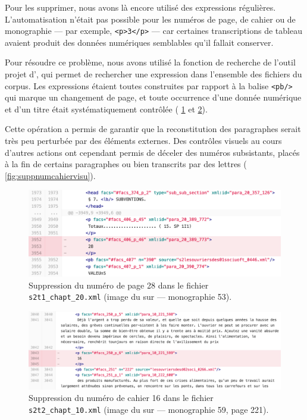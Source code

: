 Pour les supprimer, nous avons là encore utilisé des expressions régulières. L'automatisation n'était pas possible pour les numéros de page, de cahier ou de monographie --- par exemple, \texttt{<p>3</p>} --- car certaines transcriptions de tableau avaient produit des données numériques semblables qu'il fallait conserver.

Pour résoudre ce problème, nous avons utilisé la fonction de recherche de l'outil \og projet \fg{} d'\oxygen, qui permet de rechercher une expression dans l'ensemble des fichiers du corpus. Les expressions étaient toutes construites par rapport à la balise \texttt{<pb/>} qui marque un changement de page, et toute occurrence d'une donnée numérique et d'un titre était systématiquement contrôlée (\fig{} \ref{fig:supprnumpage} et \ref{fig:suppnumcahier}).

Cette opération a permis de garantir que la reconstitution des paragraphes serait très peu perturbée par des éléments externes. Des contrôles visuels au cours d'autres actions ont cependant permis de déceler des numéros subsistants, placés à la fin de certains paragraphes ou bien transcrits par des lettres (\fig{} \ref{fig:suppnumcahiervisu}).

\begin{figure}
    \centering
    \includegraphics[width=15cm]{img/suppr_num_page.png}
    \caption[Suppression d'un numéro de page]{Suppression du numéro de page 28 dans le fichier  \texttt{s2t1\_chapt\_20.xml} (image du \commit{} sur \gitlab{} --- monographie \no{}53).}
    \label{fig:supprnumpage}
\end{figure}

\begin{figure}
    \centering
    \includegraphics[width=16cm]{img/suppr_num _cahier.png}
    \caption[Suppression d'un numéro de cahier (1)]{Suppression du numéro de cahier 16 dans le fichier  \texttt{s2t2\_chapt\_10.xml} (image du \commit{} sur \gitlab{} --- monographie \no{}59, page 221).}
    \label{fig:suppnumcahier}
\end{figure}

